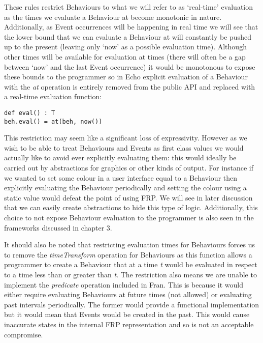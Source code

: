     These rules restrict Behaviours to what we will refer to as `real-time' evaluation as the times
    we evaluate a Behaviour at become monotonic in nature. Additionally, as Event occurrences will
    be happening in real time we will see that the lower bound that we can evaluate a Behaviour at will
    constantly be pushed up to the present (leaving only `now' as a possible evaluation time). Although
    other times will be available for evaluation at times (there will often be a gap between `now' and
    the last Event occurrence) it would be monotonous to expose these bounds to the programmer so
    in Echo explicit evaluation of a Behaviour with the
    \emph{at} operation is entirely removed from the public API and replaced with a real-time evaluation function:

\begin{verbatim}
def eval() : T
beh.eval() = at(beh, now())
\end{verbatim}  

    This restriction may seem like a significant loss of expressivity. However as we wish to be able to treat
    Behaviours and Events as first class values we would actually like to avoid ever explicitly evaluating
    them: this would ideally be carried out by abstractions for graphics or other kinds of output. For instance
    if we wanted to set some colour in a user interface equal to a Behaviour then explicitly evaluating the Behaviour
    periodically and setting the colour using a static value would defeat the point of using FRP. We will see in later
    discussion that we can easily create abstractions to hide this type of logic. Additionally, this
    choice to not expose Behaviour evaluation to the programmer is also seen in the frameworks
    discussed in chapter 3.
    
    It should also be noted that restricting evaluation times for Behaviours forces us
    to remove the \emph{timeTransform} operation for Behaviours as this function allows
    a programmer to create a Behaviour that at a time \emph{t} would be evaluated in respect
    to a time less than or greater than \emph{t}. The restriction also means we are unable to implement
    the \emph{predicate} operation included in Fran. This is because it would either require evaluating Behaviours
    at future times (not allowed) or evaluating past intervals periodically. The former would provide a functional
    implementation but it would mean that Events would be created in the past. This would cause 
    inaccurate states in the internal FRP representation and so is not an acceptable compromise.
    

